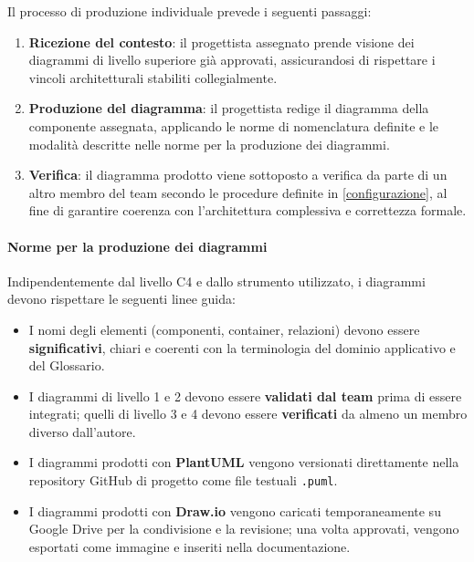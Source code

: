 \documentclass[a4paper,12pt]{article}
\begin{document}
Il processo di produzione individuale prevede i seguenti passaggi:
\begin{enumerate}
    \item \textbf{Ricezione del contesto}: il progettista assegnato prende visione dei diagrammi di livello superiore già approvati, 
    assicurandosi di rispettare i vincoli architetturali stabiliti collegialmente.
    \item \textbf{Produzione del diagramma}: il progettista redige il diagramma della componente assegnata, applicando 
    le norme di nomenclatura definite e le modalità descritte nelle norme per la produzione dei diagrammi.
    \item \textbf{Verifica}: il diagramma prodotto viene sottoposto a verifica da parte di un altro membro del team secondo le 
    procedure definite in \ref{configurazione}, al fine di garantire coerenza con l'architettura complessiva e correttezza formale.
\end{enumerate}

\paragraph{Norme per la produzione dei diagrammi}
Indipendentemente dal livello C4 e dallo strumento utilizzato, i diagrammi devono rispettare le seguenti linee guida:
\begin{itemize}
    \item I nomi degli elementi (componenti, container, relazioni) devono essere \textbf{significativi}, chiari e coerenti con 
    la terminologia del dominio applicativo e del Glossario.
    \item I diagrammi di livello 1 e 2 devono essere \textbf{validati dal team} prima di essere integrati; quelli di
     livello 3 e 4 devono essere \textbf{verificati} da almeno un membro diverso dall'autore.
    \item I diagrammi prodotti con \textbf{PlantUML} vengono versionati direttamente nella repository GitHub di progetto 
    come file testuali \texttt{.puml}.
    \item I diagrammi prodotti con \textbf{Draw.io} vengono caricati temporaneamente su Google Drive per la condivisione 
    e la revisione; una volta approvati, vengono esportati come immagine e inseriti nella documentazione.
\end{itemize}
\end{document}
